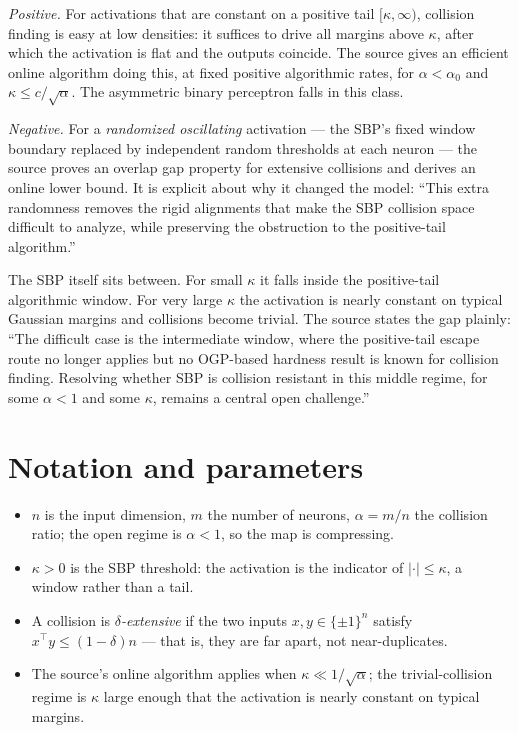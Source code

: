 \documentclass{aicr-conjecture}
\begin{document}
\emph{Positive.} For activations that are constant on a positive tail
$[\kappa, \infty)$, collision finding is easy at low densities: it
suffices to drive all margins above $\kappa$, after which the activation
is flat and the outputs coincide. The source gives an efficient online
algorithm doing this, at fixed positive algorithmic rates, for $\alpha <
\alpha_{0}$ and $\kappa \le c/\sqrt{\alpha}$. The asymmetric binary
perceptron falls in this class.

\emph{Negative.} For a \emph{randomized oscillating} activation --- the
SBP's fixed window boundary replaced by independent random thresholds at
each neuron --- the source proves an overlap gap property for extensive
collisions and derives an online lower bound. It is explicit about why it
changed the model: ``This extra randomness removes the rigid alignments
that make the SBP collision space difficult to analyze, while preserving
the obstruction to the positive-tail algorithm.''

The SBP itself sits between. For small $\kappa$ it falls inside the
positive-tail algorithmic window. For very large $\kappa$ the activation
is nearly constant on typical Gaussian margins and collisions become
trivial. The source states the gap plainly: ``The difficult case is the
intermediate window, where the positive-tail escape route no longer
applies but no OGP-based hardness result is known for collision finding.
Resolving whether SBP is collision resistant in this middle regime, for
some $\alpha < 1$ and some $\kappa$, remains a central open challenge.''

\section{Notation and parameters}\label{sec:notation}

\begin{itemize}[nosep]
  \item $n$ is the input dimension, $m$ the number of neurons, $\alpha =
    m/n$ the collision ratio; the open regime is $\alpha < 1$, so the map
    is compressing.
  \item $\kappa > 0$ is the SBP threshold: the activation is the
    indicator of $|\cdot| \le \kappa$, a window rather than a tail.
  \item A collision is \emph{$\delta$-extensive} if the two inputs $x, y
    \in \{\pm 1\}^{n}$ satisfy $x^{\top}y \le (1-\delta)n$ --- that is,
    they are far apart, not near-duplicates.
  \item The source's online algorithm applies when $\kappa \ll
    1/\sqrt{\alpha}$; the trivial-collision regime is $\kappa$ large
    enough that the activation is nearly constant on typical margins.
\end{itemize}
\end{document}
